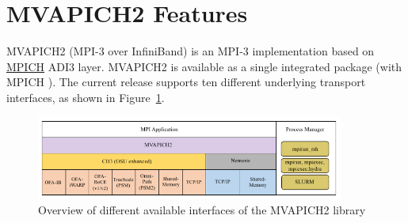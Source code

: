
% 
% 
% 


\section{MVAPICH2 \mvapichversion  Features }
\label{sec:features}

MVAPICH2 (MPI-3 over InfiniBand) is an MPI-3 implementation based on
\href{http://www.mpich.org/} {MPICH} ADI3 layer.  MVAPICH2 \mvapichversion is
available as a single integrated package (with MPICH \mpichversion).  The
current release supports ten different underlying transport interfaces, as shown
in Figure~\ref{fig:modules}. 

\begin{figure}[htbp]
 \centering
 \includegraphics[width=0.9\textwidth]{Img/mv2-interfaces.png}
 \caption{Overview of different available interfaces of the MVAPICH2 library}
 \label{fig:modules}
\end{figure}

